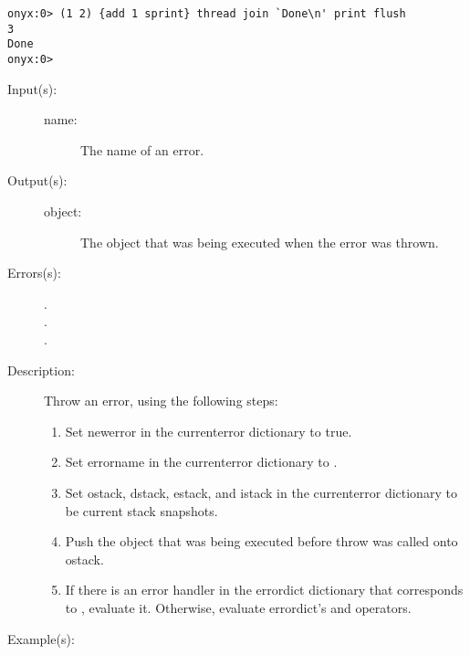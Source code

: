 \begin{description}
\begin{description}
\begin{verbatim}
onyx:0> (1 2) {add 1 sprint} thread join `Done\n' print flush
3
Done
onyx:0>
		\end{verbatim}
	\end{description}
\label{systemdict:throw}
\item[{\onyxop{name}{throw}{object}}: ]
	\begin{description}\item[]
	\item[Input(s): ]
		\begin{description}\item[]
		\item[name: ] The name of an error.
		\end{description}
	\item[Output(s): ]
		\begin{description}\item[]
		\item[object: ]
			The object that was being executed when the error was
			thrown.
		\end{description}
	\item[Errors(s): ]
		\begin{description}\item[]
		\item[.]
		\item[.]
		\item[.]
		\end{description}
	\item[Description: ]
		Throw an error, using the following steps:
		\begin{enumerate}
		\item{Set newerror in the currenterror dictionary to true.}
		\item{Set errorname in the currenterror dictionary to
		.}
		\item{Set ostack, dstack, estack, and istack in the currenterror
		dictionary to be current stack snapshots.}
		\item{Push the object that was being executed before throw was
		called onto ostack.}
		\item{If there is an error handler in the errordict dictionary
		that corresponds to , evaluate it.  Otherwise,
		evaluate errordict's
		 and
		 operators.}
		\end{enumerate}
	\item[Example(s): ]\begin{verbatim}


\end{verbatim}
\end{description}
\end{description}
